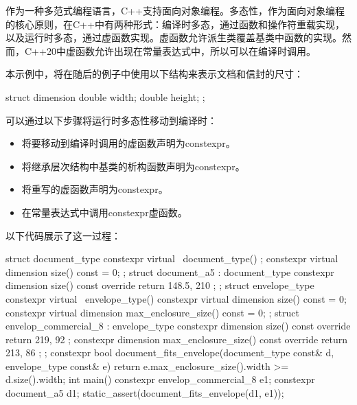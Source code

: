 作为一种多范式编程语言，C++支持面向对象编程。多态性，作为面向对象编程的核心原则，在C++中有两种形式：编译时多态，通过函数和操作符重载实现，以及运行时多态，通过虚函数实现。虚函数允许派生类覆盖基类中函数的实现。然而，C++20中虚函数允许出现在常量表达式中，所以可以在编译时调用。


本示例中，将在随后的例子中使用以下结构来表示文档和信封的尺寸：

\begin{cpp}
struct dimension
{
    double width;
    double height;
};
\end{cpp}


可以通过以下步骤将运行时多态性移动到编译时：

\begin{itemize}
\item
将要移动到编译时调用的虚函数声明为constexpr。

\item
将继承层次结构中基类的析构函数声明为constexpr。

\item
将重写的虚函数声明为constexpr。

\item
在常量表达式中调用constexpr虚函数。
\end{itemize}

以下代码展示了这一过程：

\begin{cpp}
struct document_type
{
    constexpr virtual ~document_type() {};
    constexpr virtual dimension size() const = 0;
};
struct document_a5 : document_type
{
    constexpr dimension size() const override { return { 148.5, 210 }; }
};
struct envelope_type
{
    constexpr virtual ~envelope_type() {}
    constexpr virtual dimension size() const = 0;
    constexpr virtual dimension max_enclosure_size() const = 0;
};
struct envelop_commercial_8 : envelope_type
{
    constexpr dimension size() const override { return { 219, 92 }; }
    constexpr dimension max_enclosure_size() const override
    { return { 213, 86 }; }
};
constexpr bool document_fits_envelope(document_type const& d,
envelope_type const& e)
{
    return e.max_enclosure_size().width >= d.size().width;
}
int main()
{
    constexpr envelop_commercial_8 e1;
    constexpr document_a5          d1;
    static_assert(document_fits_envelope(d1, e1));
}
\end{cpp}

